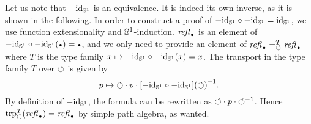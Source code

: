 \documentclass[english,a4]{article}
\begin{document}
Let us note that $-\mathord{\mathrm{id}}_{{\mathbb S^{1}}}$ is an equivalence. It is indeed its own inverse, as
it is shown in the following. In order to construct a proof of $-\mathord{\mathrm{id}}_{{\mathbb S^{1}}} \circ
-\mathord{\mathrm{id}}_{{\mathbb S^{1}}} = \mathord{\mathrm{id}}_{{\mathbb S^{1}}}$, we use function extensionality and ${{\mathbb S^{1}}}$-induction.
$\refl\base$ is an element of $-\id_\Sc\circ -\id_\Sc (\base) = \base$, and
we only need to provide an element of $\pathover {\refl\base} T \Sloop
{\refl\base}$ where $T$ is the type family $x \mapsto -\mathord{\mathrm{id}}_{{\mathbb S^{1}}} \circ -\mathord{\mathrm{id}}_{{\mathbb S^{1}}} (x)
= x$. The transport in the type family $T$ over $\mathord{\circlearrowleft}$ is given by
\begin{displaymath}
  p \mapsto \mathord{\circlearrowleft} \cdot p \cdot {[-\mathord{\mathrm{id}}_{{\mathbb S^{1}}}\circ -\mathord{\mathrm{id}}_{{\mathbb S^{1}}}](\mathord{\circlearrowleft})}^{-1}.
\end{displaymath}
By definition of $-\mathord{\mathrm{id}}_{{\mathbb S^{1}}}$, the formula can be rewritten as $\mathord{\circlearrowleft} \cdot p
\cdot {\mathord{\circlearrowleft}}^{-1}$.  Hence $\trp[T] \Sloop (\refl\base) = \refl\base$ by simple
path algebra, as wanted. 
\end{document}
